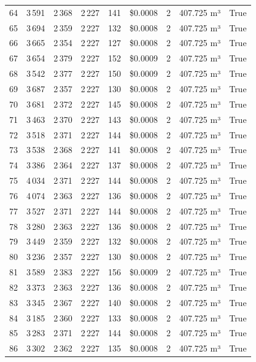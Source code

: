 \documentclass[a4paper,11pt]{article}
\begin{document}
\begin{table}[ht]
\begin{tabular}{r r r r r r r p{3cm} l}
64 & 3\,591 & 2\,368 & 2\,227 & 141 & \$0.0008 & 2 & 407.725 m³ & True \\
65 & 3\,694 & 2\,359 & 2\,227 & 132 & \$0.0008 & 2 & 407.725 m³ & True \\
66 & 3\,665 & 2\,354 & 2\,227 & 127 & \$0.0008 & 2 & 407.725 m³ & True \\
67 & 3\,654 & 2\,379 & 2\,227 & 152 & \$0.0009 & 2 & 407.725 m³ & True \\
68 & 3\,542 & 2\,377 & 2\,227 & 150 & \$0.0009 & 2 & 407.725 m³ & True \\
69 & 3\,687 & 2\,357 & 2\,227 & 130 & \$0.0008 & 2 & 407.725 m³ & True \\
70 & 3\,681 & 2\,372 & 2\,227 & 145 & \$0.0008 & 2 & 407.725 m³ & True \\
71 & 3\,463 & 2\,370 & 2\,227 & 143 & \$0.0008 & 2 & 407.725 m³ & True \\
72 & 3\,518 & 2\,371 & 2\,227 & 144 & \$0.0008 & 2 & 407.725 m³ & True \\
73 & 3\,538 & 2\,368 & 2\,227 & 141 & \$0.0008 & 2 & 407.725 m³ & True \\
74 & 3\,386 & 2\,364 & 2\,227 & 137 & \$0.0008 & 2 & 407.725 m³ & True \\
75 & 4\,034 & 2\,371 & 2\,227 & 144 & \$0.0008 & 2 & 407.725 m³ & True \\
76 & 4\,074 & 2\,363 & 2\,227 & 136 & \$0.0008 & 2 & 407.725 m³ & True \\
77 & 3\,527 & 2\,371 & 2\,227 & 144 & \$0.0008 & 2 & 407.725 m³ & True \\
78 & 3\,280 & 2\,363 & 2\,227 & 136 & \$0.0008 & 2 & 407.725 m³ & True \\
79 & 3\,449 & 2\,359 & 2\,227 & 132 & \$0.0008 & 2 & 407.725 m³ & True \\
80 & 3\,236 & 2\,357 & 2\,227 & 130 & \$0.0008 & 2 & 407.725 m³ & True \\
81 & 3\,589 & 2\,383 & 2\,227 & 156 & \$0.0009 & 2 & 407.725 m³ & True \\
82 & 3\,373 & 2\,363 & 2\,227 & 136 & \$0.0008 & 2 & 407.725 m³ & True \\
83 & 3\,345 & 2\,367 & 2\,227 & 140 & \$0.0008 & 2 & 407.725 m³ & True \\
84 & 3\,185 & 2\,360 & 2\,227 & 133 & \$0.0008 & 2 & 407.725 m³ & True \\
85 & 3\,283 & 2\,371 & 2\,227 & 144 & \$0.0008 & 2 & 407.725 m³ & True \\
86 & 3\,302 & 2\,362 & 2\,227 & 135 & \$0.0008 & 2 & 407.725 m³ & True \\

\end{tabular}
\end{table}
\end{document}
